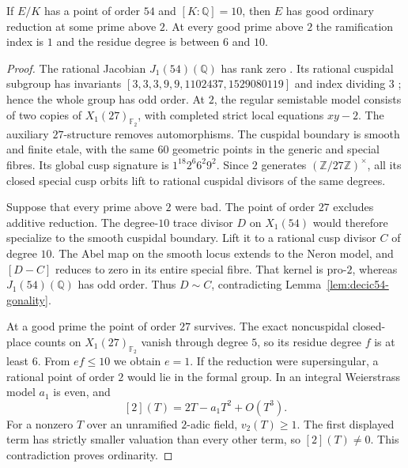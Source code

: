 \begin{lemma}\label{lem:decic54-good-ordinary2}
If $E/K$ has a point of order $54$ and $[K:\mathbb Q]=10$,
then $E$ has good ordinary reduction at some prime above $2$.
At every good prime above $2$ the ramification index is $1$ and
the residue degree is between $6$ and $10$.
\end{lemma}
\begin{proof}
The rational Jacobian $J_1(54)(\mathbb Q)$ has rank zero
\cite[Theorem~3.1(2)]{DEHMZ}. Its rational cuspidal subgroup has
invariants $[3,3,3,9,9,1102437,1529080119]$ and index dividing $3$
\cite[Theorem~4.13 and Table~2]{DEHMZ}; hence the whole group has
odd order.
At $2$, the regular semistable model consists of two copies of
$X_1(27)_{\mathbb F_2}$, with completed strict local equations
$xy-2$. The auxiliary $27$-structure removes automorphisms.
The cuspidal boundary is smooth and finite etale, with the same
$60$ geometric points in the generic and special fibres.
Its global cusp signature is $1^{18}2^6 6^2 9^2$.
Since $2$ generates $(\mathbb Z/27\mathbb Z)^\times$, all its
closed special cusp orbits lift to rational cuspidal divisors of
the same degrees.

Suppose that every prime above $2$ were bad. The point of order
$27$ excludes additive reduction. The degree-$10$ trace divisor
$D$ on $X_1(54)$ would therefore specialize to the smooth cuspidal
boundary. Lift it to a rational cusp divisor $C$ of degree $10$.
The Abel map on the smooth locus extends to the Neron model,
and $[D-C]$ reduces to zero in its entire special fibre.
That kernel is pro-$2$, whereas $J_1(54)(\mathbb Q)$ has odd order.
Thus $D\sim C$, contradicting Lemma~\ref{lem:decic54-gonality}.

At a good prime the point of order $27$ survives. The exact
noncuspidal closed-place counts on $X_1(27)_{\mathbb F_2}$ vanish
through degree $5$, so its residue degree $f$ is at least $6$.
From $ef\leq10$ we obtain $e=1$.
If the reduction were supersingular, a rational point of order
$2$ would lie in the formal group. In an integral Weierstrass
model $a_1$ is even, and
\[
 [2](T)=2T-a_1T^2+O(T^3).
\]
For a nonzero $T$ over an unramified $2$-adic field,
$v_2(T)\geq1$. The first displayed term has strictly smaller
valuation than every other term, so $[2](T)\ne0$.
This contradiction proves ordinarity.
\end{proof}
